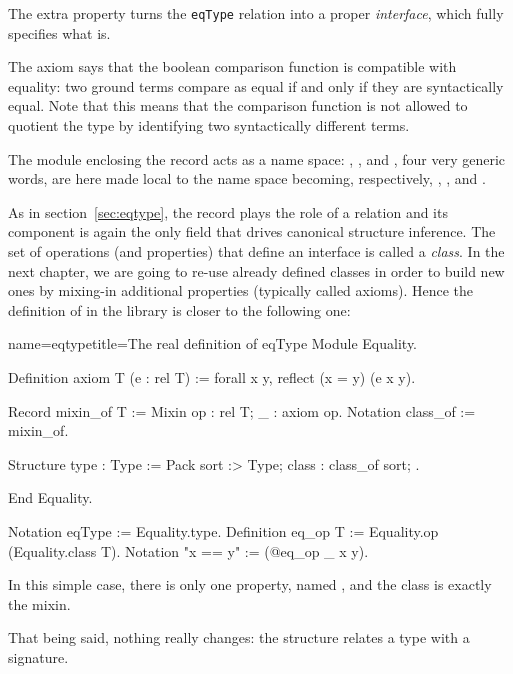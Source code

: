 The extra property turns the
\lstinline/eqType/ relation into a proper \emph{interface},
which fully specifies what  is.

The axiom says that the boolean comparison function
is compatible with equality: two ground terms compare as equal if and
only if they are syntactically equal.  Note that this means that the
comparison function is not allowed to quotient the type by identifying
two syntactically different terms.


The  module enclosing the record acts as a name space:
, ,
 and , four very generic words, are here
made local to the  name space becoming, respectively,
, ,  and .

As in section~\ref{sec:eqtype}, the record plays the role of a
relation and its  component is again the only field that
drives canonical structure inference. The set of operations (and
properties) that define an interface is called a \emph{class}.  In the
next chapter, we are going to re-use already defined classes in order
to build new ones by mixing-in additional properties (typically called
axioms).  Hence the definition of  in the \mcbMC{} library
is closer to the following one:

\begin{coq}{name=eqtype}{title=The real definition of eqType}
Module Equality.

Definition axiom T (e : rel T) := forall x y, reflect (x = y) (e x y).

Record mixin_of T := Mixin {op : rel T; _ : axiom op}.
Notation class_of := mixin_of.

Structure type : Type := Pack {sort :> Type; class : class_of sort; }.

End Equality.

Notation eqType := Equality.type.
Definition eq_op T := Equality.op (Equality.class T).
Notation "x == y" := (@eq_op _ x y).
\end{coq}

In this simple case, there is only one property, named
, and the class is exactly the mixin.

That being said, nothing really changes: the  structure
relates a type with a signature.

